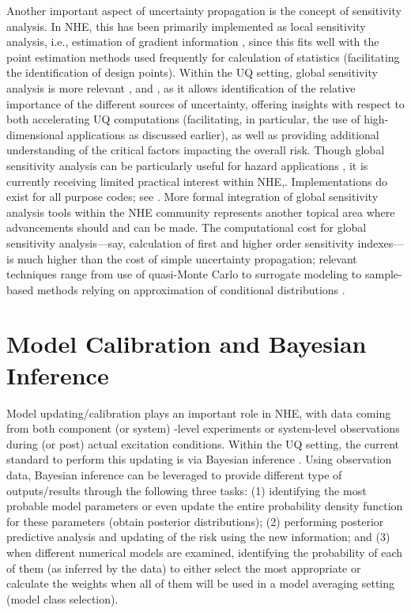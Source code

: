 Another important aspect of uncertainty propagation is the concept of sensitivity analysis. In NHE, this has been primarily implemented as local sensitivity analysis, i.e., estimation of gradient information \citep{haukaas2007methods,gu2009finite}, since this fits well with the point estimation methods used frequently for calculation of statistics (facilitating the identification of design points). Within the UQ setting, global sensitivity analysis is more relevant \citep{sobol1990sensitivity,saltelli2002making}, and \citep{rahman2016fsensitivity}, as it allows identification of the relative importance of the different sources of uncertainty, offering insights with respect to both accelerating UQ computations (facilitating, in particular, the use of high-dimensional applications as discussed earlier), as well as providing additional understanding of the critical factors impacting the overall risk. Though global sensitivity analysis can be particularly useful for hazard applications \citep{vetter2012global}, it is currently receiving limited practical interest within NHE,. Implementations do exist for all purpose codes; see \citep{bourinet2009review}. More formal integration of global sensitivity analysis tools within the NHE community represents another topical area where advancements should and can be made. The computational cost for global sensitivity analysis---say, calculation of first and higher order sensitivity indexes---is much higher than the cost of simple uncertainty propagation; relevant techniques range from use of quasi-Monte Carlo \citep{saltelli2002making} to surrogate modeling \citep{sudret2008global} to sample-based methods relying on approximation of conditional distributions \citep{li2016efficient,hu2019probability}.  

\section{Model Calibration and Bayesian Inference}
\label{sec:uq_calibration}

Model updating/calibration plays an important role in NHE, with data coming from both component (or system) -level experiments or system-level observations during (or post) actual excitation conditions. Within the UQ setting, the current standard to perform this updating is via Bayesian inference \citep{beck2010bayesian,kontoroupi2017online}. Using observation data, Bayesian inference can be leveraged to provide different type of outputs/results \citep{beck2013prior} through the following three tasks: (1) identifying the most probable model parameters or even update the entire probability density function for these parameters (obtain posterior distributions); (2) performing posterior predictive analysis and updating of the risk using the new information; and (3) when different numerical models are examined, identifying the probability of each of them (as inferred by the data) to either select the most appropriate or calculate the weights when all of them will be used in a model averaging setting (model class selection).

